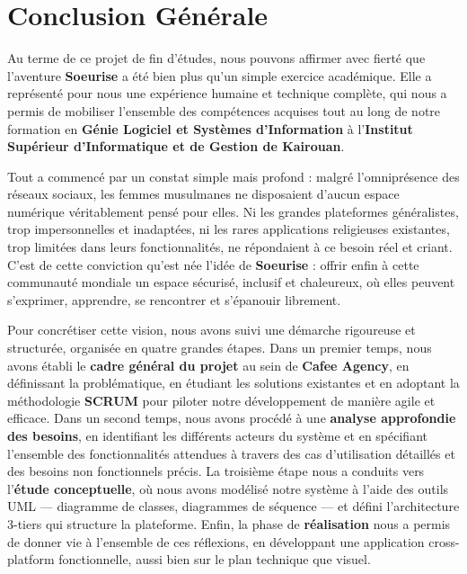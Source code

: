 \documentclass[12pt,a4paper]{report}
\begin{document}
	\chapter*{Conclusion Générale}
	
	Au terme de ce projet de fin d'études, nous pouvons affirmer avec fierté 
	que l'aventure \textbf{Soeurise} a été bien plus qu'un simple exercice 
	académique. Elle a représenté pour nous une expérience humaine et technique 
	complète, qui nous a permis de mobiliser l'ensemble des compétences acquises 
	tout au long de notre formation en \textbf{Génie Logiciel et Systèmes 
		d'Information} à l'\textbf{Institut Supérieur d'Informatique et de Gestion 
		de Kairouan}.
	
	\medskip
	
	Tout a commencé par un constat simple mais profond : malgré l'omniprésence 
	des réseaux sociaux, les femmes musulmanes ne disposaient d'aucun espace 
	numérique véritablement pensé pour elles. Ni les grandes plateformes 
	généralistes, trop impersonnelles et inadaptées, ni les rares applications 
	religieuses existantes, trop limitées dans leurs fonctionnalités, ne 
	répondaient à ce besoin réel et criant. C'est de cette conviction qu'est 
	née l'idée de \textbf{Soeurise} : offrir enfin à cette communauté mondiale 
	un espace sécurisé, inclusif et chaleureux, où elles peuvent s'exprimer, 
	apprendre, se rencontrer et s'épanouir librement.
	
	\medskip
	
	Pour concrétiser cette vision, nous avons suivi une démarche rigoureuse 
	et structurée, organisée en quatre grandes étapes. Dans un premier temps, 
	nous avons établi le \textbf{cadre général du projet} au sein de 
	\textbf{Cafee Agency}, en définissant la problématique, en étudiant 
	les solutions existantes et en adoptant la méthodologie \textbf{SCRUM} 
	pour piloter notre développement de manière agile et efficace. Dans un 
	second temps, nous avons procédé à une \textbf{analyse approfondie des 
		besoins}, en identifiant les différents acteurs du système et en 
	spécifiant l'ensemble des fonctionnalités attendues à travers des cas 
	d'utilisation détaillés et des besoins non fonctionnels précis. La 
	troisième étape nous a conduits vers l'\textbf{étude conceptuelle}, 
	où nous avons modélisé notre système à l'aide des outils UML — diagramme 
	de classes, diagrammes de séquence — et défini l'architecture 3-tiers 
	qui structure la plateforme. Enfin, la phase de \textbf{réalisation} 
	nous a permis de donner vie à l'ensemble de ces réflexions, en 
	développant une application cross-platform fonctionnelle, aussi bien 
	sur le plan technique que visuel.
	
\end{document}
